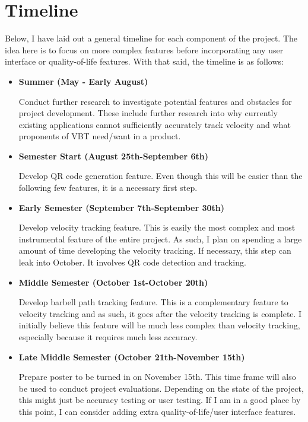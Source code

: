 \documentclass[10pt,twocolumn]{article}
\begin{document}
\section{Timeline}
Below, I have laid out a general timeline for each component of the project.
The idea here is to focus on more complex features before incorporating any user interface or quality-of-life features.
With that said, the timeline is as follows:
\begin{itemize}
    \item\textbf{Summer (May - Early August)} 
    
    Conduct further research to investigate potential features and obstacles for project development. These include further research into why currently existing applications cannot sufficiently accurately track velocity and what proponents of VBT need/want in a product.
    \item\textbf{Semester Start (August 25th-September 6th)}
    
    Develop QR code generation feature. Even though this will be easier than the following few features, it is a necessary first step.
    
    \item\textbf{Early Semester (September 7th-September 30th)}
    
    Develop velocity tracking feature. This is easily the most complex and most instrumental feature of the entire project. As such, I plan on spending a large amount of time developing the velocity tracking. If necessary, this step can leak into October. It involves QR code detection and tracking.
    \item\textbf{Middle Semester (October 1st-October 20th)}
    
    Develop barbell path tracking feature. This is a complementary feature to velocity tracking and as such, it goes after the velocity tracking is complete. I initially believe this feature will be much less complex than velocity tracking, especially because it requires much less accuracy.
    
    \item\textbf{Late Middle Semester (October 21th-November 15th)} 
    
    Prepare poster to be turned in on November 15th. This time frame will also be used to conduct project evaluations. Depending on the state of the project, this might just be accuracy testing or user testing. If I am in a good place by this point, I can consider adding extra quality-of-life/user interface features.
    

\end{itemize}
\end{document}
